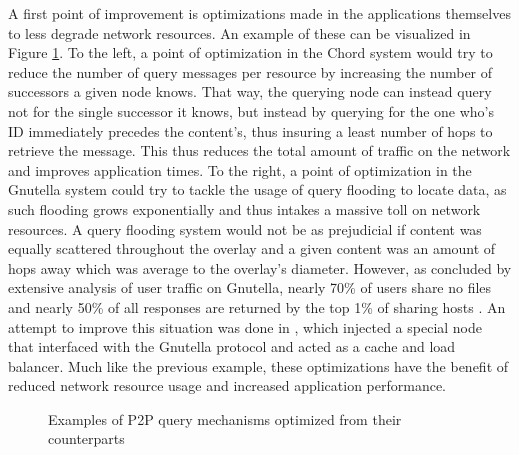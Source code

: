     A first point of improvement is optimizations made in the applications themselves to less degrade network resources.
    An example of these can be visualized in Figure \ref{fig:p2p-optimization}.
    To the left, a point of optimization in the Chord system would try to reduce the number of query messages per resource by increasing the number of successors a given node knows.
    That way, the querying node can instead query not for the single successor it knows, but instead by querying for the one who's ID immediately precedes the content's, thus insuring a least number of hops to retrieve the message.
    This thus reduces the total amount of traffic on the network and improves application times.
    To the right, a point of optimization in the Gnutella system could try to tackle the usage of query flooding to locate data, as such flooding grows exponentially and thus intakes a massive toll on network resources.
    A query flooding system would not be as prejudicial if content was equally scattered throughout the overlay and a given content was an amount of hops away which was average to the overlay's diameter.
    However, as concluded by extensive analysis of user traffic on Gnutella, nearly 70\% of users share no files and nearly 50\% of all responses are returned by the top 1\% of sharing hosts \cite{freeriding-gnutella}.
    An attempt to improve this situation was done in \cite{altruistic-gnutella}, which injected a special node that interfaced with the Gnutella protocol and acted as a cache and load balancer.
    Much like the previous example, these optimizations have the benefit of reduced network resource usage and increased application performance.


\begin{figure}%
\centering
{}%
\qquad
{}%
\caption{Examples of P2P query mechanisms optimized from their counterparts}
\label{fig:p2p-optimization}
\end{figure}

